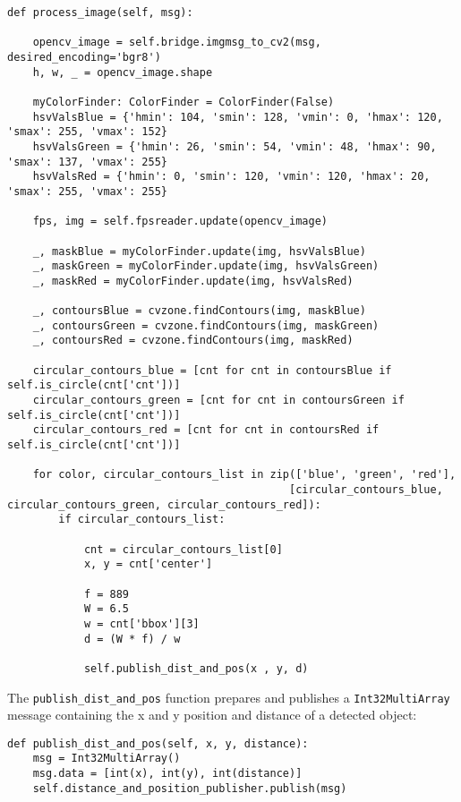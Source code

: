 \begin{lstlisting}[language=PythonPlus]
def process_image(self, msg):

    opencv_image = self.bridge.imgmsg_to_cv2(msg, desired_encoding='bgr8')
    h, w, _ = opencv_image.shape

    myColorFinder: ColorFinder = ColorFinder(False)
    hsvValsBlue = {'hmin': 104, 'smin': 128, 'vmin': 0, 'hmax': 120, 'smax': 255, 'vmax': 152}
    hsvValsGreen = {'hmin': 26, 'smin': 54, 'vmin': 48, 'hmax': 90, 'smax': 137, 'vmax': 255}
    hsvValsRed = {'hmin': 0, 'smin': 120, 'vmin': 120, 'hmax': 20, 'smax': 255, 'vmax': 255}

    fps, img = self.fpsreader.update(opencv_image)

    _, maskBlue = myColorFinder.update(img, hsvValsBlue)
    _, maskGreen = myColorFinder.update(img, hsvValsGreen)
    _, maskRed = myColorFinder.update(img, hsvValsRed)

    _, contoursBlue = cvzone.findContours(img, maskBlue)
    _, contoursGreen = cvzone.findContours(img, maskGreen)
    _, contoursRed = cvzone.findContours(img, maskRed)

    circular_contours_blue = [cnt for cnt in contoursBlue if self.is_circle(cnt['cnt'])]
    circular_contours_green = [cnt for cnt in contoursGreen if self.is_circle(cnt['cnt'])]
    circular_contours_red = [cnt for cnt in contoursRed if self.is_circle(cnt['cnt'])]

    for color, circular_contours_list in zip(['blue', 'green', 'red'],
                                            [circular_contours_blue, circular_contours_green, circular_contours_red]):
        if circular_contours_list:

            cnt = circular_contours_list[0]
            x, y = cnt['center']

            f = 889
            W = 6.5
            w = cnt['bbox'][3]
            d = (W * f) / w

            self.publish_dist_and_pos(x , y, d)

\end{lstlisting}

The \verb|publish_dist_and_pos| function prepares and publishes a \verb|Int32MultiArray| message containing the x and y position and distance of a detected object:

\begin{lstlisting}[language=PythonPlus]
def publish_dist_and_pos(self, x, y, distance):
    msg = Int32MultiArray()
    msg.data = [int(x), int(y), int(distance)]
    self.distance_and_position_publisher.publish(msg)
\end{lstlisting}

